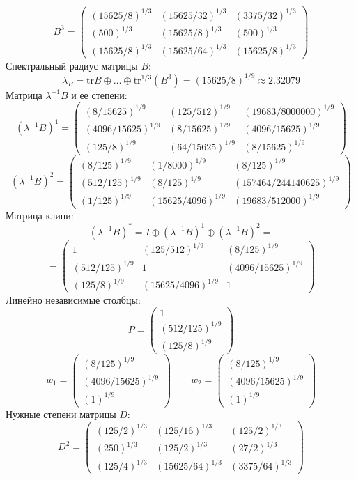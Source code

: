 $$B^3 = \begin{pmatrix}
(15625/8)^{1/3} & (15625/32)^{1/3} & (3375/32)^{1/3}\\
(500)^{1/3} & (15625/8)^{1/3} & (500)^{1/3}\\
(15625/8)^{1/3} & (15625/64)^{1/3} & (15625/8)^{1/3}
\end{pmatrix}
$$
Спектральный радиус матрицы $B$:
$$\lambda_{B} = \mathrm{tr}B\oplus \dots \oplus \mathrm{tr}^{1/3}(B^{3}) = (15625/8)^{1/9} \approx 2.32079$$
Матрица $\lambda^{-1}B$ и ее степени:
$$(\lambda^{-1}B)^1 = \begin{pmatrix}
(8/15625)^{1/9} & (125/512)^{1/9} & (19683/8000000)^{1/9}\\
(4096/15625)^{1/9} & (8/15625)^{1/9} & (4096/15625)^{1/9}\\
(125/8)^{1/9} & (64/15625)^{1/9} & (8/15625)^{1/9}
\end{pmatrix}
$$
$$(\lambda^{-1}B)^2 = \begin{pmatrix}
(8/125)^{1/9} & (1/8000)^{1/9} & (8/125)^{1/9}\\
(512/125)^{1/9} & (8/125)^{1/9} & (157464/244140625)^{1/9}\\
(1/125)^{1/9} & (15625/4096)^{1/9} & (19683/512000)^{1/9}
\end{pmatrix}
$$
Матрица клини:
$$(\lambda^{-1}B)^* = I \oplus (\lambda^{-1}B)^1 \oplus (\lambda^{-1}B)^2 = $$
$$ = \begin{pmatrix}
1 & (125/512)^{1/9} & (8/125)^{1/9}\\
(512/125)^{1/9} & 1 & (4096/15625)^{1/9}\\
(125/8)^{1/9} & (15625/4096)^{1/9} & 1
\end{pmatrix}
$$
Линейно независимые столбцы:
$$P = \begin{pmatrix}
1\\
(512/125)^{1/9}\\
(125/8)^{1/9}
\end{pmatrix}
$$
$$w_1 = \begin{pmatrix}
(8/125)^{1/9}\\
(4096/15625)^{1/9}\\
(1)^{1/9}
\end{pmatrix}
\qquad w_2 = \begin{pmatrix}
(8/125)^{1/9}\\
(4096/15625)^{1/9}\\
(1)^{1/9}
\end{pmatrix}
$$
Нужные степени матрицы $D$:
$$D^2 = \begin{pmatrix}
(125/2)^{1/3} & (125/16)^{1/3} & (125/2)^{1/3}\\
(250)^{1/3} & (125/2)^{1/3} & (27/2)^{1/3}\\
(125/4)^{1/3} & (15625/64)^{1/3} & (3375/64)^{1/3}
\end{pmatrix}
$$
